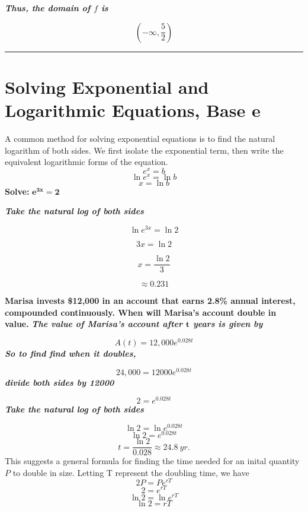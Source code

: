 \documentclass{report}
\begin{document}
\noindent \textbf{\textit{Thus, the domain of $f$ is}}

$$ \left(-\infty, \dfrac{5}{2}\right)$$
\bigbreak \noindent \bigbreak \noindent
\hrule
\bigbreak \noindent
\section*{Solving Exponential and Logarithmic Equations, Base e}
A common method for solving exponential equations is to find the natural logarithm of both sides. We first isolate the exponential term, then write the equivalent logarithmic forms of the equation.
\bigbreak \noindent
$$ e^x = b$$
$$ \ln{e^x = \ln{b}}$$
$$ x = \ln{b}$$
\bigbreak \noindent
\q
\bigbreak \noindent
\textbf{Solve:} $\mathbf{e^{3x} = 2}$
\bigbreak \noindent 
\vspace{2mm}

\noindent\textit{\textbf{Take the natural log of both sides}}

$$ \ln{e^{3x}} = \ln{2}$$

$$ 3x = \ln{2}$$

$$ x = \dfrac{\ln{2}}{3}$$

$$ \approx 0.231$$

\pagebreak
\q
\bigbreak \noindent
\textbf{Marisa invests \$12,000 in an account that earns 2.8\% annual interest, compounded continuously. When will Marisa's account double in value.}
\bigbreak \noindent
\textit{\textbf{The value of Marisa's account after $\mathbf{t}$ years is given by}}

$$ A(t) = 12,000e^{0.028t}$$
\textit{\textbf{So to find find when it doubles,}}

$$24,000 = 12000e^{0.028t}$$
\textit{\textbf{divide both sides by 12000}}

$$ 2 = e^{0.028t}$$
\textit{\textbf{Take the natural log of both sides}}

$$ \ln{2} = \ln{e^{0.028t}}$$
$$  \ln{2} = e^{0.028t}$$
$$ t = \dfrac{\ln{2}}{0.028} \approx 24.8 \ yr.$$
\bigbreak \noindent
This suggests a general formula for finding the time needed for an inital quantity $P$ to double in size.
\bigbreak \noindent
Letting T represent the doubling time, we have
$$ 2P = Pe^{rT}$$
$$ 2 = e^{rT}$$
$$\ln{2} = \ln{e^{rT}}$$
$$ \ln{2} = {rT}$$
\bigbreak \noindent
{}
\bigbreak \noindent
{}
\pagebreak
\end{document}
